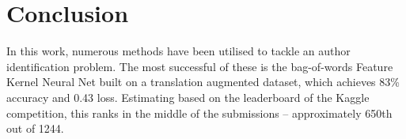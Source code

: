 \section{Conclusion}
\label{sec:conclusion}
In this work, numerous methods have been utilised to tackle an author identification problem. The most successful of these is the bag-of-words Feature Kernel Neural Net built on a translation augmented dataset, which achieves 83\% accuracy and 0.43 loss. Estimating based on the leaderboard of the Kaggle competition, this ranks in the middle of the submissions -- approximately 650th out of 1244.